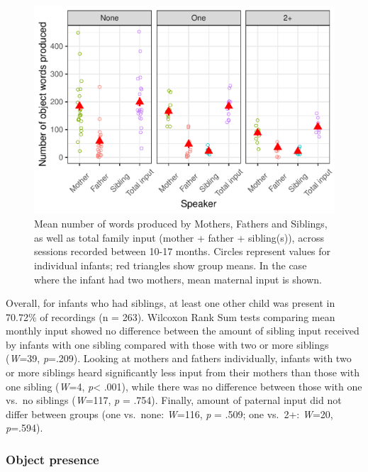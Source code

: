 \documentclass[
  english,
  man,floatsintext]{apa6}
\begin{document}
\begin{figure}
\centering
\includegraphics{SiblingsStudyText_files/figure-latex/Figure-Speaker-count-1.pdf}
\caption{\label{fig:Figure-Speaker-count}Mean number of words produced by Mothers, Fathers and Siblings, as well as total family input (mother + father + sibling(s)), across sessions recorded between 10-17 months. Circles represent values for individual infants; red triangles show group means. In the case where the infant had two mothers, mean maternal input is shown.}
\end{figure}

Overall, for infants who had siblings, at least one other child was present in 70.72\% of recordings (n = 263). Wilcoxon Rank Sum tests comparing mean monthly input showed no difference between the amount of sibling input received by infants with one sibling compared with those with two or more siblings (\emph{W}=39, \emph{p}=.209). Looking at mothers and fathers individually, infants with two or more siblings heard significantly less input from their mothers than those with one sibling (\emph{W}=4, \emph{p}\textless{} .001), while there was no difference between those with one vs.~no siblings (\emph{W}=117, \emph{p} = .754). Finally, amount of paternal input did not differ between groups (one vs.~none: \emph{W}=116, \emph{p} = .509; one vs.~2+: \emph{W}=20, \emph{p}=.594).

\hypertarget{object-presence}{%
\subsubsection{Object presence}\label{object-presence}}
\end{document}
